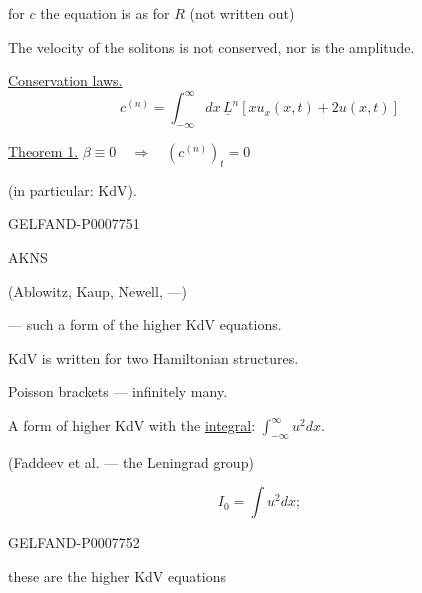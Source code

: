 for \(c\) the equation is as for \(R\) (not written out)

The velocity of the solitons is not conserved, nor is the amplitude.

\underline{Conservation laws.}
\begin{equation}
c^{(n)}=\int_{-\infty}^{\infty}dx\,\underline L^n[xu_x(x,t)+2u(x,t)]\tag{5}
\end{equation}

\underline{Theorem 1.} \(\beta\equiv0\quad\Rightarrow\quad(c^{(n)})_t=0\)

(in particular: \(\mathrm{KdV}\)).


\begin{GelfandAdjacentEvidence}{GELFAND-P000775}{1}

AKNS

(Ablowitz, Kaup, Newell, ---)

--- such a form of the higher KdV equations.

KdV is written for two Hamiltonian structures.

Poisson brackets --- infinitely many.

A form of higher KdV with the \underline{integral}: \(\displaystyle\int_{-\infty}^\infty u^2dx\).

(Faddeev et al. --- the Leningrad group)


\[
I_0=\int u^2dx;
\]
\end{GelfandAdjacentEvidence}
\begin{GelfandAdjacentEvidence}{GELFAND-P000775}{2}

these are the higher KdV equations

\end{GelfandAdjacentEvidence}
